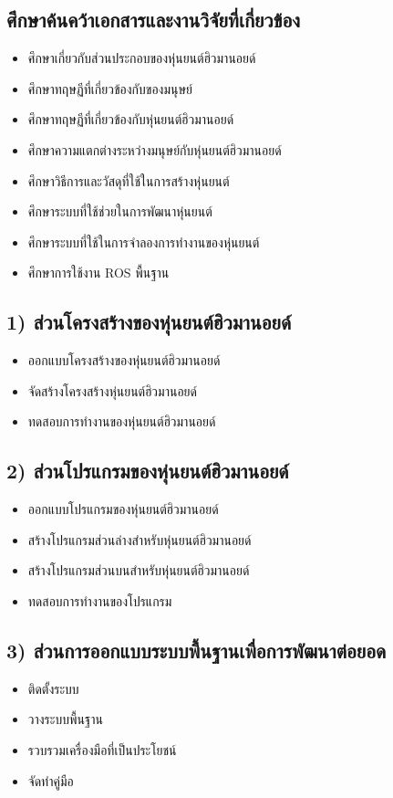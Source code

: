 \subsection*{ศึกษาค้นคว้าเอกสารและงานวิจัยที่เกี่ยวข้อง}
\begin{itemize}\setlength\itemsep{-0.3em}
	\item ศึกษาเกี่ยวกับส่วนประกอบของหุ่นยนต์ฮิวมานอยด์
	\item ศึกษาทฤษฏีที่เกี่ยวข้องกับของมนุษย์
	\item ศึกษาทฤษฏีที่เกี่ยวข้องกับหุ่นยนต์ฮิวมานอยด์
	\item ศึกษาความแตกต่างระหว่างมนุษย์กับหุ่นยนต์ฮิวมานอยด์
	\item ศึกษาวิธีการและวัสดุที่ใช้ในการสร้างหุ่นยนต์
	\item ศึกษาระบบที่ใช้ช่วยในการพัฒนาหุ่นยนต์
	\item ศึกษาระบบที่ใช้ในการจำลองการทำงานของหุ่นยนต์
	\item ศึกษาการใช้งาน ROS พื้นฐาน
\end{itemize}
\subsection*{1) ส่วนโครงสร้างของหุ่นยนต์ฮิวมานอยด์}
\begin{itemize}\setlength\itemsep{-0.3em}
	\item ออกแบบโครงสร้างของหุ่นยนต์ฮิวมานอยด์
	\item จัดสร้างโครงสร้างหุ่นยนต์ฮิวมานอยด์
	\item ทดสอบการทำงานของหุ่นยนต์ฮิวมานอยด์
\end{itemize}
\subsection*{2) ส่วนโปรแกรมของหุ่นยนต์ฮิวมานอยด์}
\begin{itemize}\setlength\itemsep{-0.3em}
	\item ออกแบบโปรแกรมของหุ่นยนต์ฮิวมานอยด์
	\item สร้างโปรแกรมส่วนล่างสำหรับหุ่นยนต์ฮิวมานอยด์
	\item สร้างโปรแกรมส่วนบนสำหรับหุ่นยนต์ฮิวมานอยด์
	\item ทดสอบการทำงานของโปรแกรม
\end{itemize}
\subsection*{3) ส่วนการออกแบบระบบพื้นฐานเพื่อการพัฒนาต่อยอด}
\begin{itemize}\setlength\itemsep{-0.3em}
	\item ติดตั้งระบบ
	\item วางระบบพื้นฐาน
	\item รวบรวมเครื่องมือที่เป็นประโยชน์
	\item จัดทำคู่มือ
\end{itemize}

